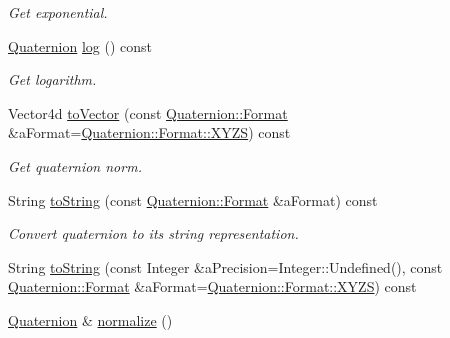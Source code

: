 \begin{DoxyCompactItemize}
\begin{DoxyCompactList}\small\item\em Get exponential. \end{DoxyCompactList}\item 
\hyperlink{classlibrary_1_1math_1_1geom_1_1trf_1_1rot_1_1_quaternion}{Quaternion} \hyperlink{classlibrary_1_1math_1_1geom_1_1trf_1_1rot_1_1_quaternion_a9bcc04be5d0b9128860c9e494abbf5ee}{log} () const
\begin{DoxyCompactList}\small\item\em Get logarithm. \end{DoxyCompactList}\item 
Vector4d \hyperlink{classlibrary_1_1math_1_1geom_1_1trf_1_1rot_1_1_quaternion_a8401dab8c0b8b1b99efbdba1354ba497}{to\+Vector} (const \hyperlink{classlibrary_1_1math_1_1geom_1_1trf_1_1rot_1_1_quaternion_a2ca851b117657819310fe5a9b9e5d681}{Quaternion\+::\+Format} \&a\+Format=\hyperlink{classlibrary_1_1math_1_1geom_1_1trf_1_1rot_1_1_quaternion_a2ca851b117657819310fe5a9b9e5d681a11c51ecd5dc6f86ba3c1ae79e21482f5}{Quaternion\+::\+Format\+::\+X\+Y\+ZS}) const
\begin{DoxyCompactList}\small\item\em Get quaternion norm. \end{DoxyCompactList}\item 
String \hyperlink{classlibrary_1_1math_1_1geom_1_1trf_1_1rot_1_1_quaternion_adb8b06d466e8235dd5ff4ded9331a85f}{to\+String} (const \hyperlink{classlibrary_1_1math_1_1geom_1_1trf_1_1rot_1_1_quaternion_a2ca851b117657819310fe5a9b9e5d681}{Quaternion\+::\+Format} \&a\+Format) const
\begin{DoxyCompactList}\small\item\em Convert quaternion to its string representation. \end{DoxyCompactList}\item 
String \hyperlink{classlibrary_1_1math_1_1geom_1_1trf_1_1rot_1_1_quaternion_a7e25375352f2e329a6053524d7deb226}{to\+String} (const Integer \&a\+Precision=Integer\+::\+Undefined(), const \hyperlink{classlibrary_1_1math_1_1geom_1_1trf_1_1rot_1_1_quaternion_a2ca851b117657819310fe5a9b9e5d681}{Quaternion\+::\+Format} \&a\+Format=\hyperlink{classlibrary_1_1math_1_1geom_1_1trf_1_1rot_1_1_quaternion_a2ca851b117657819310fe5a9b9e5d681a11c51ecd5dc6f86ba3c1ae79e21482f5}{Quaternion\+::\+Format\+::\+X\+Y\+ZS}) const
\item 
\hyperlink{classlibrary_1_1math_1_1geom_1_1trf_1_1rot_1_1_quaternion}{Quaternion} \& \hyperlink{classlibrary_1_1math_1_1geom_1_1trf_1_1rot_1_1_quaternion_a54cc89da4b3f36d7037b940c141e07ce}{normalize} ()

\end{DoxyCompactItemize}
